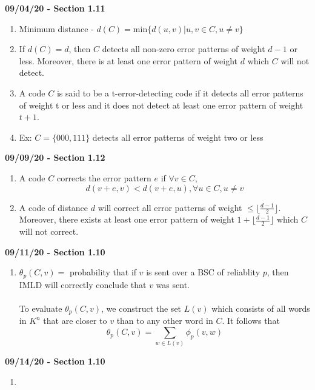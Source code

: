 \documentclass[11pt]{article}
\newcommand{\skipline}{\vspace{\baselineskip}}
\begin{document}
	\skipline
	\textbf{09/04/20 - Section 1.11}
	\begin{enumerate}
		\item Minimum distance - $d(C) = \text{min}\{d(u,v)| u,v \in C, u \not= v\}$
		\item If $d(C) = d$, then $C$ detects all non-zero error patterns of weight $d - 1$ or less. Moreover, there is at least one error pattern of weight $d$ which $C$ will not detect.
  
		\item A code $C$ is said to be a t-error-detecting code if it detects all error patterns of weight t or less and it does not detect at least one error pattern of weight $t + 1$.
		\item Ex: $C = \{000, 111\}$ detects all error patterns of weight two or less
	\end{enumerate}

	\skipline
	\textbf{09/09/20 - Section 1.12}
	\begin{enumerate}
		\item A code $C$ corrects the error pattern $e$ if $\forall v \in C$, 
		$$d(v+e,v) < d(v+e,u), \forall u \in C, u \not = v$$
		\item A code of distance $d$ will correct all error patterns of weight $\leq \lfloor \frac{d-1}{2}\rfloor$.  Moreover, there exists at least one error pattern of weight $1 + \lfloor\frac{d-1}{2} \rfloor$ which $C$ will not correct.
	\end{enumerate}

	\skipline
	\textbf{09/11/20 - Section 1.10}
	\begin{enumerate}
		\item $\theta_p(C,v) =$ probability that if $v$ is sent over a BSC of reliablity $p$, then IMLD will correctly conclude that $v$ was sent.
		\\ \\
		To evaluate $\theta_p(C,v)$, we construct the set $L(v)$ which consists of all words in $K^n$ that are closer to $v$ than to any other word in $C$. It follows that 
		$$\theta_p(C,v) = \sum_{w \in L(v)} \phi_p(v,w)$$
	\end{enumerate}

	\skipline
	\textbf{09/14/20 - Section 1.10}
	\begin{enumerate}
		\item 
	\end{enumerate}
\end{document}
